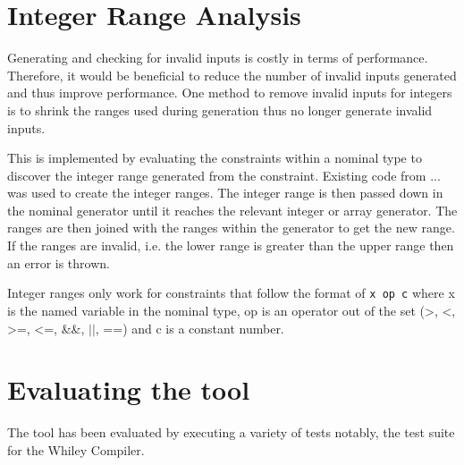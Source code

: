 \section{Integer Range Analysis}

Generating and checking for invalid inputs is costly in terms of performance. 
Therefore, it would be beneficial to reduce the number of invalid inputs generated and thus improve performance.
One method to remove invalid inputs for integers is to shrink the ranges used during generation thus no longer generate invalid inputs.


This is implemented by evaluating the constraints within a nominal type to discover the integer range generated from the constraint. Existing code from ... was used to create the integer ranges. 
The integer range is then passed down in the nominal generator until it reaches the relevant integer or array generator. 
The ranges are then joined with the ranges within the generator to get the new range. 
If the ranges are invalid, i.e. the lower range is greater than the upper range then an error is thrown.

Integer ranges only work for constraints that follow the format of \texttt{x op c} where x is the named variable in the nominal type, op is an operator out of the set (\textgreater, \textless, \textgreater=, \textless=, \&\&, $||$, ==) and c is a constant number.


\section{Evaluating the tool}
The tool has been evaluated by executing a variety of tests notably, the test suite for the Whiley Compiler.
